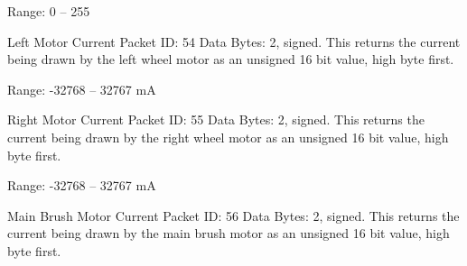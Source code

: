 \begin{Desc}
\begin{description}
Range\+: 0 – 255 \item[{\em 
\hypertarget{group__roomba-lib_gga46f008b5055c4a08d3123c6a3478373eaeadd154f9f2f7647caf3488d27bd4fef}{}R\+O\+O\+M\+B\+A\+\_\+\+L\+E\+F\+T\+\_\+\+M\+O\+T\+O\+R\+\_\+\+C\+U\+R\+R\+E\+N\+T\label{group__roomba-lib_gga46f008b5055c4a08d3123c6a3478373eaeadd154f9f2f7647caf3488d27bd4fef}
}]Left Motor Current Packet I\+D\+: 54 Data Bytes\+: 2, signed. This returns the current being drawn by the left wheel motor as an unsigned 16 bit value, high byte first.

Range\+: -\/32768 – 32767 m\+A \item[{\em 
\hypertarget{group__roomba-lib_gga46f008b5055c4a08d3123c6a3478373ea7a02b4928368639e9bd9fcec9656462b}{}R\+O\+O\+M\+B\+A\+\_\+\+R\+I\+G\+H\+T\+\_\+\+M\+O\+T\+O\+R\+\_\+\+C\+U\+R\+R\+E\+N\+T\label{group__roomba-lib_gga46f008b5055c4a08d3123c6a3478373ea7a02b4928368639e9bd9fcec9656462b}
}]Right Motor Current Packet I\+D\+: 55 Data Bytes\+: 2, signed. This returns the current being drawn by the right wheel motor as an unsigned 16 bit value, high byte first.

Range\+: -\/32768 – 32767 m\+A \item[{\em 
\hypertarget{group__roomba-lib_gga46f008b5055c4a08d3123c6a3478373ea31137d3179ccc5981923bd6aa8b63b95}{}R\+O\+O\+M\+B\+A\+\_\+\+M\+A\+I\+N\+\_\+\+B\+R\+U\+S\+H\+\_\+\+C\+U\+R\+R\+E\+N\+T\label{group__roomba-lib_gga46f008b5055c4a08d3123c6a3478373ea31137d3179ccc5981923bd6aa8b63b95}
}]Main Brush Motor Current Packet I\+D\+: 56 Data Bytes\+: 2, signed. This returns the current being drawn by the main brush motor as an unsigned 16 bit value, high byte first.


\end{description}
\end{Desc}
